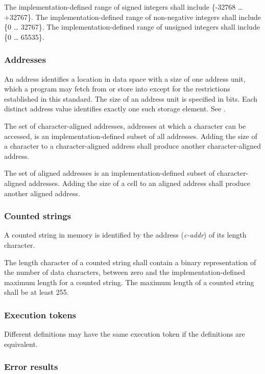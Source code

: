 The implementation-defined range of signed integers shall include
\{-32768 {\ldots} +32767\}. The im\-ple\-ment\-ation-de\-fined range of
non-negative integers shall include \{0 {\ldots} 32767\}. The
implementation-defined range of unsigned integers shall include
\{0 {\ldots} 65535\}.

\subsubsection{Addresses} %
\label{usage:addr}

An address identifies a location in data space with a size of one
address unit, which a program may fetch from or store into except
for the restrictions established in this standard. The size of an
address unit is specified in bits. Each distinct address value
identifies exactly one such storage element.
See .

The set of character-aligned addresses, addresses at which a
character can be accessed, is an im\-ple\-ment\-ation-de\-fined subset of
all addresses. Adding the size of a character to a character-aligned
address shall produce another character-aligned address.

The set of aligned addresses is an implementation-defined subset
of character-aligned addresses. Adding the size of a cell to an
aligned address shall produce another aligned address.

\subsubsection{Counted strings} %
\label{usage:cstring}

A counted string in memory is identified by the address
(\emph{c-addr}) of its length character.

The length character of a counted string shall contain a binary
representation of the number of data characters, between zero and
the implementation-defined maximum length for a counted string.
The maximum length of a counted string shall be at least 255.

\subsubsection{Execution tokens} %

Different definitions may have the same execution token if the
definitions are equivalent.

\subsubsection{Error results} %
\label{usage:ior}


